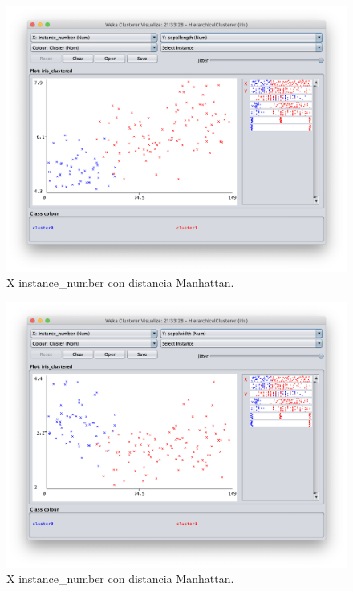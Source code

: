 \documentclass[11pt]{exam}
\begin{document}
\begin{questions}
\begin{figure}[h]
	\centering
	\includegraphics[scale=0.5]{hc_sepallebgth.png}
	\caption{X instance\_number con distancia Manhattan.}
	\label{Captura_7}
\end{figure}


\begin{figure}[h]
	\centering
	\includegraphics[scale=0.5]{hc_sepalwidth.png}
	\caption{X instance\_number con distancia Manhattan.}
	\label{Captura_8}
\end{figure}


\end{questions}
\end{document}
